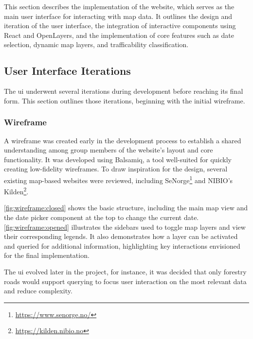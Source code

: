 This section describes the implementation of the website, which serves as the main user interface for interacting with map data. It outlines the design and iteration of the user interface, the integration of interactive components using React and OpenLayers, and the implementation of core features such as date selection, dynamic map layers, and trafficability classification.

\subsection{User Interface Iterations} %

The \acrfull{ui} underwent several iterations during development before reaching its final form. This section outlines those iterations, beginning with the initial wireframe.

\subsubsection*{Wireframe}

A wireframe was created early in the development process to establish a shared understanding among group members of the website's layout and core functionality. It was developed using Balsamiq, a tool well-suited for quickly creating low-fidelity wireframes. To draw inspiration for the design, several existing map-based websites were reviewed, including SeNorge\footnote{\url{https://www.senorge.no/}} and NIBIO's Kilden\footnote{\url{https://kilden.nibio.no}}.

\autoref{fig:wireframe:closed} shows the basic structure, including the main map view and the date picker component at the top to change the current date. \autoref{fig:wireframe:opened} illustrates the sidebars used to toggle map layers and view their corresponding legends. It also demonstrates how a layer can be activated and queried for additional information, highlighting key interactions envisioned for the final implementation.

The \acrshort{ui} evolved later in the project, for instance, it was decided that only forestry roads would support querying to focus user interaction on the most relevant data and reduce complexity.

